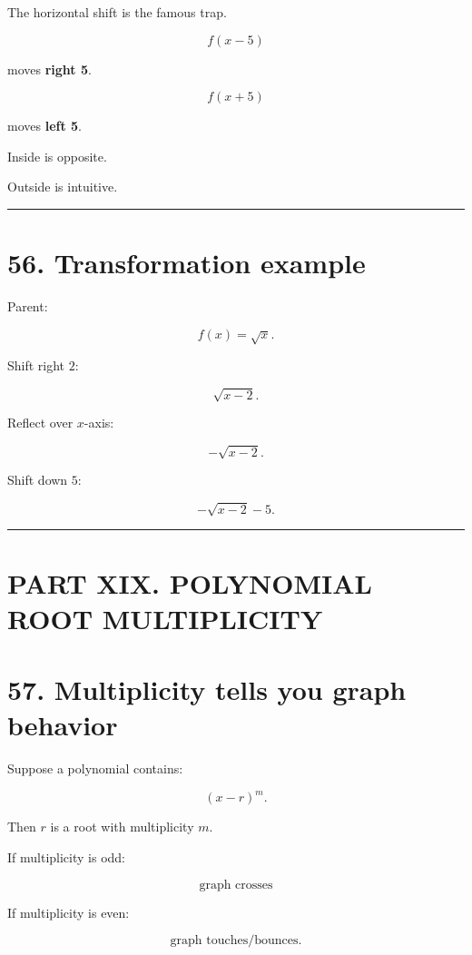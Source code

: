 \documentclass[
]{article}
\begin{document}
The horizontal shift is the famous trap.

\[
f(x-5)
\]

moves \textbf{right 5}.

\[
f(x+5)
\]

moves \textbf{left 5}.

Inside is opposite.

Outside is intuitive.

\begin{center}\rule{0.5\linewidth}{0.5pt}\end{center}

\section{56. Transformation example}\label{transformation-example}

Parent:

\[
f(x)=\sqrt x.
\]

Shift right \(2\):

\[
\sqrt{x-2}.
\]

Reflect over \(x\)-axis:

\[
-\sqrt{x-2}.
\]

Shift down \(5\):

\[
\boxed{-\sqrt{x-2}-5}.
\]

\begin{center}\rule{0.5\linewidth}{0.5pt}\end{center}

\section{PART XIX. POLYNOMIAL ROOT
MULTIPLICITY}\label{part-xix.-polynomial-root-multiplicity}

\section{57. Multiplicity tells you graph
behavior}\label{multiplicity-tells-you-graph-behavior}

Suppose a polynomial contains:

\[
(x-r)^m.
\]

Then \(r\) is a root with multiplicity \(m\).

If multiplicity is odd:

\[
\boxed{\text{graph crosses}}
\]

If multiplicity is even:

\[
\boxed{\text{graph touches/bounces}}.
\]
\end{document}
